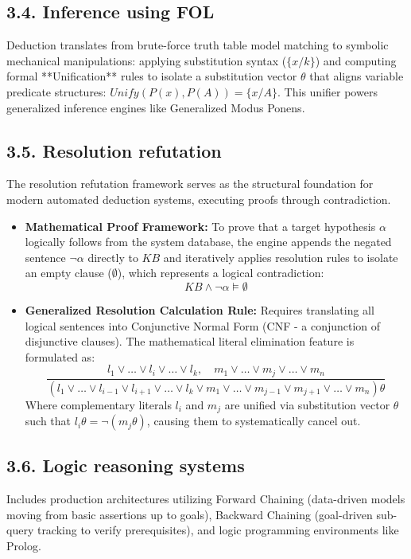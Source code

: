 \documentclass[11pt,a4paper]{article}
\begin{document}
\subsection{3.4. Inference using FOL}
Deduction translates from brute-force truth table model matching to symbolic mechanical manipulations: applying substitution syntax ($\{x/k\}$) and computing formal **Unification** rules to isolate a substitution vector $\theta$ that aligns variable predicate structures: $Unify(P(x), P(A)) = \{x/A\}$. This unifier powers generalized inference engines like Generalized Modus Ponens.

\subsection{3.5. Resolution refutation}
The resolution refutation framework serves as the structural foundation for modern automated deduction systems, executing proofs through contradiction.
\begin{itemize}
    \item \textbf{Mathematical Proof Framework:} To prove that a target hypothesis $\alpha$ logically follows from the system database, the engine appends the negated sentence $\neg\alpha$ directly to $KB$ and iteratively applies resolution rules to isolate an empty clause ($\emptyset$), which represents a logical contradiction:
    \begin{equation}
        KB \wedge \neg\alpha \models \emptyset
    \end{equation}
    \item \textbf{Generalized Resolution Calculation Rule:} Requires translating all logical sentences into Conjunctive Normal Form (CNF - a conjunction of disjunctive clauses). The mathematical literal elimination feature is formulated as:
    \begin{equation}
        \frac{l_1 \vee \dots \vee l_i \vee \dots \vee l_k, \quad m_1 \vee \dots \vee m_j \vee \dots \vee m_n}{(l_1 \vee \dots \vee l_{i-1} \vee l_{i+1} \vee \dots \vee l_k \vee m_1 \vee \dots \vee m_{j-1} \vee m_{j+1} \vee \dots \vee m_n)\theta}
    \end{equation}
    Where complementary literals $l_i$ and $m_j$ are unified via substitution vector $\theta$ such that $l_i\theta = \neg (m_j\theta)$, causing them to systematically cancel out.
\end{itemize}

\subsection{3.6. Logic reasoning systems}
Includes production architectures utilizing Forward Chaining (data-driven models moving from basic assertions up to goals), Backward Chaining (goal-driven sub-query tracking to verify prerequisites), and logic programming environments like Prolog.
\end{document}

